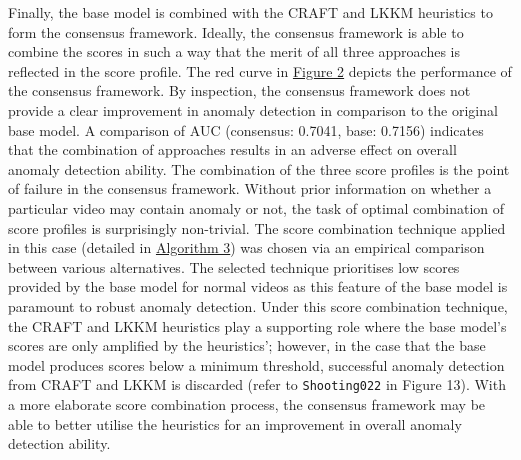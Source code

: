 \documentclass[sigplan,authorversion,nonacm, 9pt]{acmart}
\begin{document}
\par
Finally, the base model is combined with the CRAFT and LKKM heuristics to form the consensus framework. Ideally, the consensus framework is able to combine the scores in such a way that the merit of all three approaches is reflected in the score profile. The red curve in \hyperref[fig:ROC]{Figure 2} depicts the performance of the consensus framework. By inspection, the consensus framework does not provide a clear improvement in anomaly detection in comparison to the original base model. A comparison of AUC (consensus: 0.7041, base: 0.7156) indicates that the combination of approaches results in an adverse effect on overall anomaly detection ability. The combination of the three score profiles is the point of failure in the consensus framework. Without prior information on whether a particular video may contain anomaly or not, the task of optimal combination of score profiles is surprisingly non-trivial. The score combination technique applied in this case (detailed in \hyperref[fig:psCON]{Algorithm 3}) was chosen via an empirical comparison between various alternatives. The selected technique prioritises low scores provided by the base model for normal videos as this feature of the base model is paramount to robust anomaly detection. Under this score combination technique, the CRAFT and LKKM heuristics play a supporting role where the base model's scores are only amplified by the heuristics'; however, in the case that the base model produces scores below a minimum threshold, successful anomaly detection from CRAFT and LKKM is discarded (refer to \texttt{Shooting022} in Figure 13). With a more elaborate score combination process, the consensus framework may be able to better utilise the heuristics for an improvement in overall anomaly detection ability.
\par
\end{document}
